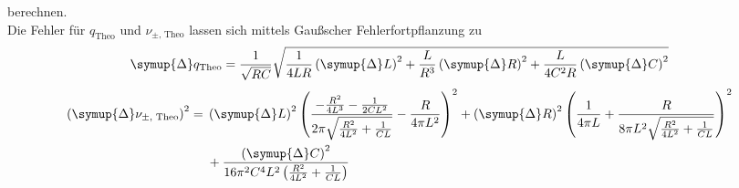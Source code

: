 berechnen.\\
Die Fehler für $q_\text{Theo}$ und $\nu_{\pm\text{, Theo}}$ lassen sich mittels Gaußscher Fehlerfortpflanzung zu
\begin{equation}
    \symup{\Delta} q_\text{Theo} = \frac{1}{\sqrt{RC}} \sqrt{\frac{1}{4LR} \left ( \symup{\Delta} L \right )^2 + \frac{L}{R^3} \left ( \symup{\Delta} R \right )^2 
    + \frac{L}{4C^2R} \left ( \symup{\Delta} C \right )^2} 
\end{equation}
\begin{equation}
    \begin{split}
    \left ( \symup{\Delta} \nu_{\pm\text{, Theo}} \right )^2= {} & \left ( \symup{\Delta} L \right)^{2} \left(\frac{- \frac{R^{2}}{4 L^{3}} - \frac{1}{2 C L^{2}}}{2 \pi \sqrt{\frac{R^{2}}{4 L^{2}} + \frac{1}{C L}}} - \frac{R}{4 \pi L^{2}}\right)^{2} + \left ( \symup{\Delta} R \right)^{2} \left(\frac{1}{4 \pi L} + \frac{R}{8 \pi L^{2} \sqrt{\frac{R^{2}}{4 L^{2}} + \frac{1}{C L}}}\right)^{2} \\
    & + \frac{\left ( \symup{\Delta} C \right)^{2}}{16 \pi^{2} C^{4} L^{2} \left(\frac{R^{2}}{4L^{2}} + \frac{1}{C L}\right)}
    \end{split}
\end{equation}